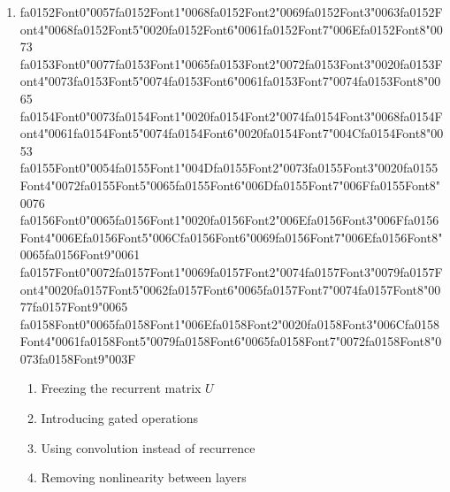 \documentclass[12pt]{article}
\begin{document}
\begin{enumerate}[label=Q\arabic*.]
 \item {\csname fa0152Font0\endcsname\char"0057}{\csname fa0152Font1\endcsname\char"0068}{\csname fa0152Font2\endcsname\char"0069}{\csname fa0152Font3\endcsname\char"0063}{\csname fa0152Font4\endcsname\char"0068}{\csname fa0152Font5\endcsname\char"0020}{\csname fa0152Font6\endcsname\char"0061}{\csname fa0152Font7\endcsname\char"006E}{\csname fa0152Font8\endcsname\char"0073} {\csname fa0153Font0\endcsname\char"0077}{\csname fa0153Font1\endcsname\char"0065}{\csname fa0153Font2\endcsname\char"0072}{\csname fa0153Font3\endcsname\char"0020}{\csname fa0153Font4\endcsname\char"0073}{\csname fa0153Font5\endcsname\char"0074}{\csname fa0153Font6\endcsname\char"0061}{\csname fa0153Font7\endcsname\char"0074}{\csname fa0153Font8\endcsname\char"0065} {\csname fa0154Font0\endcsname\char"0073}{\csname fa0154Font1\endcsname\char"0020}{\csname fa0154Font2\endcsname\char"0074}{\csname fa0154Font3\endcsname\char"0068}{\csname fa0154Font4\endcsname\char"0061}{\csname fa0154Font5\endcsname\char"0074}{\csname fa0154Font6\endcsname\char"0020}{\csname fa0154Font7\endcsname\char"004C}{\csname fa0154Font8\endcsname\char"0053} {\csname fa0155Font0\endcsname\char"0054}{\csname fa0155Font1\endcsname\char"004D}{\csname fa0155Font2\endcsname\char"0073}{\csname fa0155Font3\endcsname\char"0020}{\csname fa0155Font4\endcsname\char"0072}{\csname fa0155Font5\endcsname\char"0065}{\csname fa0155Font6\endcsname\char"006D}{\csname fa0155Font7\endcsname\char"006F}{\csname fa0155Font8\endcsname\char"0076} {\csname fa0156Font0\endcsname\char"0065}{\csname fa0156Font1\endcsname\char"0020}{\csname fa0156Font2\endcsname\char"006E}{\csname fa0156Font3\endcsname\char"006F}{\csname fa0156Font4\endcsname\char"006E}{\csname fa0156Font5\endcsname\char"006C}{\csname fa0156Font6\endcsname\char"0069}{\csname fa0156Font7\endcsname\char"006E}{\csname fa0156Font8\endcsname\char"0065}{\csname fa0156Font9\endcsname\char"0061} {\csname fa0157Font0\endcsname\char"0072}{\csname fa0157Font1\endcsname\char"0069}{\csname fa0157Font2\endcsname\char"0074}{\csname fa0157Font3\endcsname\char"0079}{\csname fa0157Font4\endcsname\char"0020}{\csname fa0157Font5\endcsname\char"0062}{\csname fa0157Font6\endcsname\char"0065}{\csname fa0157Font7\endcsname\char"0074}{\csname fa0157Font8\endcsname\char"0077}{\csname fa0157Font9\endcsname\char"0065} {\csname fa0158Font0\endcsname\char"0065}{\csname fa0158Font1\endcsname\char"006E}{\csname fa0158Font2\endcsname\char"0020}{\csname fa0158Font3\endcsname\char"006C}{\csname fa0158Font4\endcsname\char"0061}{\csname fa0158Font5\endcsname\char"0079}{\csname fa0158Font6\endcsname\char"0065}{\csname fa0158Font7\endcsname\char"0072}{\csname fa0158Font8\endcsname\char"0073}{\csname fa0158Font9\endcsname\char"003F}
 \begin{enumerate}[label=(\Alph*)]
     \item Freezing the recurrent matrix $U$
     \item Introducing gated operations
     \item Using convolution instead of recurrence
     \item Removing nonlinearity between layers
 \end{enumerate}
 

\end{enumerate}
\end{document}

